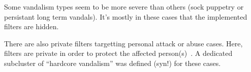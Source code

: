 Some vandalism types seem to be more severe than others (sock puppetry or persistant long term vandals).
It's mostly in these cases that the implemented filters are hidden.

There are also private filters targetting personal attack or abuse cases.
Here, filters are private in order to protect the affected person(s)~\cite{Wikipedia:EditFilter}.
A dedicated subcluster of ``hardcore vandalism'' was defined (syn!) for these cases.

